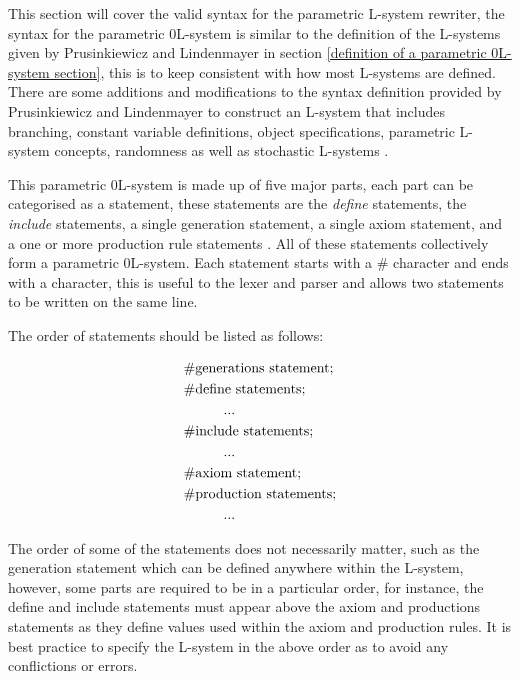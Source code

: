 This section will cover the valid syntax for the parametric L-system rewriter, the syntax for the parametric 0L-system is similar to the definition of the L-systems given by Prusinkiewicz and Lindenmayer in section \ref{definition of a parametric 0L-system section}, this is to keep consistent with how most L-systems are defined. There are some additions and modifications to the syntax definition provided by Prusinkiewicz and Lindenmayer to construct an L-system that includes branching, constant variable definitions, object specifications, parametric L-system concepts, randomness as well as stochastic L-systems \cite{prusinkiewicz2012algorithmic}. 

This parametric 0L-system is made up of five major parts, each part can be categorised as a statement, these statements are the \textit{define} statements, the \textit{include} statements, a single generation statement, a single axiom statement, and a one or more production rule statements \cite{prusinkiewicz2013lindenmayer}. All of these statements collectively form a parametric 0L-system. Each statement starts with a \# character and ends with a \say{;} character, this is useful to the lexer and parser and allows two statements to be written on the same line. 

The order of statements should be listed as follows: 

\begin{equation} \label{statement order example}
\begin{aligned}
	&\text{\#generations statement;}\\
	&\text{\#define statements;}\\
	&\text{\hspace{10mm}...}\\
	&\text{\#include statements;}\\
	&\text{\hspace{10mm}...}\\
	&\text{\#axiom statement;}\\
	&\text{\#production statements;}\\
	&\text{\hspace{10mm}...}\\
\end{aligned}
\end{equation}

The order of some of the statements does not necessarily matter, such as the generation statement which can be defined anywhere within the L-system, however, some parts are required to be in a particular order, for instance, the define and include statements must appear above the axiom and productions statements as they define values used within the axiom and production rules. It is best practice to specify the L-system in the above order as to avoid any conflictions or errors. 


